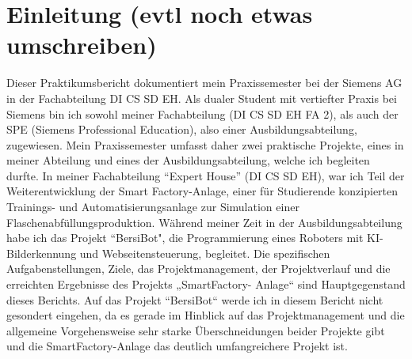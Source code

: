 \chapter{Einleitung (evtl noch etwas umschreiben)}\label{ch:data}

\label{sec:Einleitung}

Dieser Praktikumsbericht dokumentiert mein Praxissemester bei der Siemens AG in der Fachabteilung DI CS SD EH.
Als dualer Student mit vertiefter Praxis bei Siemens bin ich sowohl meiner Fachabteilung (DI CS SD EH FA 2), als auch der SPE  
(Siemens Professional Education), also einer Ausbildungsabteilung, zugewiesen.
Mein Praxissemester umfasst daher zwei praktische Projekte, eines in meiner Abteilung und eines der Ausbildungsabteilung, welche ich begleiten 
durfte. In meiner Fachabteilung “Expert House” (DI CS SD EH), war ich Teil der Weiterentwicklung der Smart Factory-Anlage, einer für 
Studierende konzipierten Trainings- und Automatisierungsanlage zur Simulation einer Flaschenabfüllungsproduktion. Während meiner Zeit in der 
Ausbildungsabteilung habe ich das Projekt “BersiBot", die Programmierung eines Roboters mit KI-Bilderkennung und Webseitensteuerung, begleitet.
Die spezifischen Aufgabenstellungen, Ziele, das Projektmanagement,
der Projektverlauf und die erreichten Ergebnisse des Projekts „SmartFactory-
Anlage“ sind Hauptgegenstand dieses Berichts. Auf das Projekt “BersiBot“ werde
ich in diesem Bericht nicht gesondert eingehen, da es gerade im Hinblick auf das
Projektmanagement und die allgemeine Vorgehensweise sehr starke
Überschneidungen beider Projekte gibt und die SmartFactory-Anlage das deutlich
umfangreichere Projekt ist.

